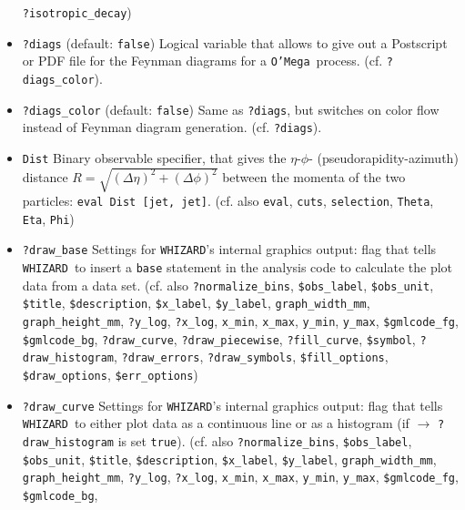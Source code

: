 \documentclass[12pt]{book}
\newcommand{\ttt}[1]{\texttt{#1}}
\newcommand{\whizard}{\texttt{WHIZARD}}
\newcommand{\oMega}{\texttt{O'Mega}}
\begin{document}
\begin{itemize}
\newline \ttt{?isotropic\_decay})
\item
\ttt{?diags} \qquad (default: \ttt{false}) \newline
Logical variable that allows to give out a Postscript or PDF file 
for the Feynman diagrams for a \oMega\ process. (cf. \ttt{?diags\_color}). 
\item
\ttt{?diags\_color} \qquad (default: \ttt{false}) \newline
Same as \ttt{?diags}, but switches on color flow instead of Feynman
diagram generation. (cf. \ttt{?diags}). 
\item
\ttt{Dist} \newline
Binary observable specifier, that gives the $\eta$-$\phi$-
(pseudorapidity-azimuth) distance $R = \sqrt{(\Delta \eta)^2 +
(\Delta\phi)^2}$ between the momenta of the two particles: \ttt{eval
Dist [jet, jet]}. (cf. also \ttt{eval}, \ttt{cuts}, \ttt{selection},
\ttt{Theta}, \ttt{Eta}, \ttt{Phi})  
\item
\ttt{?draw\_base} \newline
Settings for \whizard's internal graphics output: flag that tells
\whizard\ to insert a \ttt{base} statement in the analysis code to
calculate the plot data from a data set. (cf. also
\ttt{?normalize\_bins}, \ttt{\$obs\_label}, \ttt{\$obs\_unit}, 
\ttt{\$title}, \ttt{\$description}, \ttt{\$x\_label},
\ttt{\$y\_label}, \ttt{graph\_width\_mm}, \ttt{graph\_height\_mm},
\ttt{?y\_log}, \ttt{?x\_log}, \ttt{x\_min}, \ttt{x\_max}, 
\ttt{y\_min}, \ttt{y\_max}, \newline \ttt{\$gmlcode\_fg}, \ttt{\$gmlcode\_bg},
\ttt{?draw\_curve}, \ttt{?draw\_piecewise},
\ttt{?fill\_curve}, \ttt{\$symbol}, \newline \ttt{?draw\_histogram},
\ttt{?draw\_errors}, \ttt{?draw\_symbols}, \ttt{\$fill\_options},
\ttt{\$draw\_options}, \newline \ttt{\$err\_options})
\item
\ttt{?draw\_curve} \newline
Settings for \whizard's internal graphics output: flag that tells
\whizard\ to either plot data as a continuous line or as a histogram
(if $\to$ \ttt{?draw\_histogram} is set \ttt{true}). (cf. also
\ttt{?normalize\_bins}, \ttt{\$obs\_label}, \ttt{\$obs\_unit}, 
\ttt{\$title}, \ttt{\$description}, \ttt{\$x\_label},
\ttt{\$y\_label}, \ttt{graph\_width\_mm}, \ttt{graph\_height\_mm},
\ttt{?y\_log}, \ttt{?x\_log}, \ttt{x\_min}, \ttt{x\_max}, 
\ttt{y\_min}, \ttt{y\_max}, \newline \ttt{\$gmlcode\_fg}, \ttt{\$gmlcode\_bg},

\end{itemize}
\end{document}
